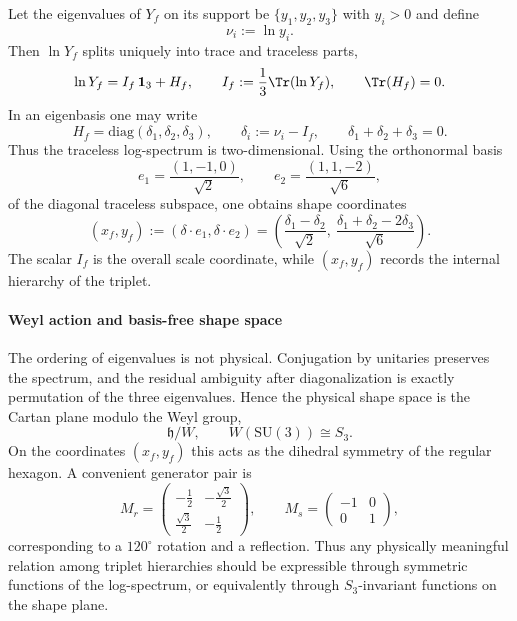 \documentclass[12pt,a4paper]{article}
\begin{document}
Let the eigenvalues of $Y_f$ on its support be $\{y_1,y_2,y_3\}$ with $y_i>0$ and define
\[
\nu_i:=\ln y_i.
\]
Then $\ln Y_f$ splits uniquely into trace and traceless parts,
\begin{equation}
\label{p4:eq:part2-logsplit}
\ln Y_f
=
I_f\,\mathbf 1_3 + H_f,
\qquad
I_f:=\frac13\Tr(\ln Y_f),
\qquad
\Tr(H_f)=0.
\end{equation}
In an eigenbasis one may write
\[
H_f=\mathrm{diag}(\delta_1,\delta_2,\delta_3),
\qquad
\delta_i:=\nu_i-I_f,
\qquad
\delta_1+\delta_2+\delta_3=0.
\]
Thus the traceless log-spectrum is two-dimensional.
Using the orthonormal basis
\[
e_1=\frac{(1,-1,0)}{\sqrt2},
\qquad
e_2=\frac{(1,1,-2)}{\sqrt6},
\]
of the diagonal traceless subspace, one obtains shape coordinates
\begin{equation}
\label{p4:eq:part2-xy}
(x_f,y_f):=(\delta\cdot e_1,\delta\cdot e_2)
=
\left(\frac{\delta_1-\delta_2}{\sqrt2},\ \frac{\delta_1+\delta_2-2\delta_3}{\sqrt6}\right).
\end{equation}
The scalar $I_f$ is the overall scale coordinate, while $(x_f,y_f)$ records the internal hierarchy of the triplet.



\paragraph{Weyl action and basis-free shape space}
\label{p4:sec:part2-threelevel-weyl}

The ordering of eigenvalues is not physical.
Conjugation by unitaries preserves the spectrum, and the residual ambiguity after diagonalization is exactly permutation of the three eigenvalues.
Hence the physical shape space is the Cartan plane modulo the Weyl group,
\[
\mathfrak h/W,
\qquad
W(\mathrm{SU}(3))\cong S_3.
\]
On the coordinates $(x_f,y_f)$ this acts as the dihedral symmetry of the regular hexagon.
A convenient generator pair is
\[
M_r=
\begin{pmatrix}
-\tfrac12 & -\tfrac{\sqrt3}{2}\\[0.2em]
 \tfrac{\sqrt3}{2} & -\tfrac12
\end{pmatrix},
\qquad
M_s=
\begin{pmatrix}
-1 & 0\\
0 & 1
\end{pmatrix},
\]
corresponding to a $120^\circ$ rotation and a reflection.
Thus any physically meaningful relation among triplet hierarchies should be expressible through symmetric functions of the log-spectrum, or equivalently through $S_3$-invariant functions on the shape plane.
\end{document}
